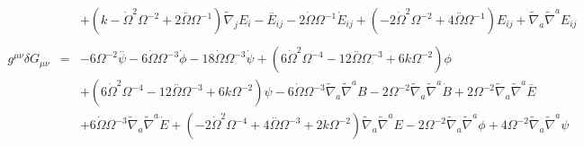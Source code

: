\documentclass[10pt,letterpaper]{article}
\numberwithin{equation}{section}
\begin{document}
\begin{eqnarray}
&& + (k -  \dot{\Omega}^2 \Omega^{-2} + 2 \overset{..}{\Omega} \Omega^{-1}) \tilde{\nabla}_{j}E_{i}- \overset{..}{E}_{ij} - 2 \dot{\Omega} \Omega^{-1} \dot{E}_{ij} + (-2 \dot{\Omega}^2 \Omega^{-2} + 4 \overset{..}{\Omega} \Omega^{-1}) E_{ij} + \tilde{\nabla}_{a}\tilde{\nabla}^{a}E_{ij}
\\  \nonumber\\ 
g^{\mu\nu}\delta G_{\mu\nu}&=& -6 \Omega^{-2} \overset{..}{\psi} - 6 \dot{\Omega} \Omega^{-3} \dot{\phi} - 18 \dot{\Omega} \Omega^{-3} \dot{\psi} + (6 \dot{\Omega}^2 \Omega^{-4} - 12 \overset{..}{\Omega} \Omega^{-3} + 6 k \Omega^{-2}) \phi \nonumber \\ 
&& + (6 \dot{\Omega}^2 \Omega^{-4} - 12 \overset{..}{\Omega} \Omega^{-3} + 6 k \Omega^{-2}) \psi - 6 \dot{\Omega} \Omega^{-3} \tilde{\nabla}_{a}\tilde{\nabla}^{a}B - 2 \Omega^{-2} \tilde{\nabla}_{a}\tilde{\nabla}^{a}\dot{B} + 2 \Omega^{-2} \tilde{\nabla}_{a}\tilde{\nabla}^{a}\overset{..}{E} \nonumber \\ 
&& + 6 \dot{\Omega} \Omega^{-3} \tilde{\nabla}_{a}\tilde{\nabla}^{a}\dot{E} + (-2 \dot{\Omega}^2 \Omega^{-4} + 4 \overset{..}{\Omega} \Omega^{-3} + 2 k \Omega^{-2}) \tilde{\nabla}_{a}\tilde{\nabla}^{a}E - 2 \Omega^{-2} \tilde{\nabla}_{a}\tilde{\nabla}^{a}\phi + 4 \Omega^{-2} \tilde{\nabla}_{a}\tilde{\nabla}^{a}\psi 
\end{eqnarray}
\end{document}
